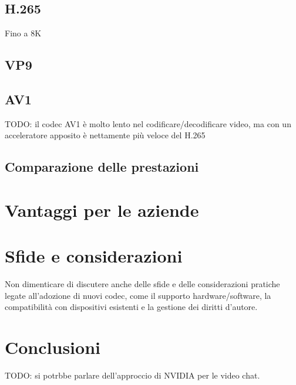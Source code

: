 \documentclass[a4paper,12pt, oneside]{article}
\begin{document}
\subsection{H.265}
Fino a 8K
\subsection{VP9}    %
\subsection{AV1}
TODO: il codec AV1 è molto lento nel codificare/decodificare video, ma con un acceleratore apposito è nettamente più veloce del H.265

\subsection{Comparazione delle prestazioni}

\section{Vantaggi per le aziende}

\section{Sfide e considerazioni}
Non dimenticare di discutere anche delle sfide e delle considerazioni pratiche legate all'adozione di nuovi codec, come il supporto hardware/software, la compatibilità con dispositivi esistenti e la gestione dei diritti d'autore.

\section{Conclusioni}
TODO: si potrbbe parlare dell'approccio di NVIDIA per le video chat.
\end{document}
